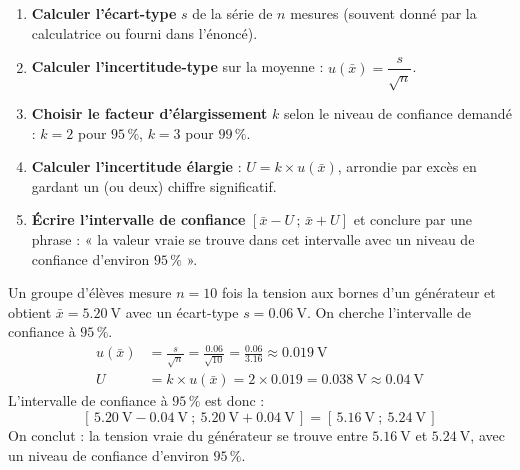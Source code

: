 \documentclass[11pt]{article}
\begin{document}
\begin{methode}
\begin{enumerate}
\item \textbf{Calculer l'écart-type} $s$ de la série de $n$ mesures (souvent donné par la calculatrice ou fourni dans l'énoncé).
\item \textbf{Calculer l'incertitude-type} sur la moyenne : $u(\bar{x}) = \dfrac{s}{\sqrt{n}}$.
\item \textbf{Choisir le facteur d'élargissement} $k$ selon le niveau de confiance demandé : $k = 2$ pour $95\,\%$, $k = 3$ pour $99\,\%$.
\item \textbf{Calculer l'incertitude élargie} : $U = k \times u(\bar{x})$, arrondie par excès en gardant un (ou deux) chiffre significatif.
\item \textbf{Écrire l'intervalle de confiance} $[\bar{x} - U \,;\, \bar{x} + U]$ et conclure par une phrase : « la valeur vraie se trouve dans cet intervalle avec un niveau de confiance d'environ $95\,\%$ ».
\end{enumerate}
\end{methode}

\begin{exemplebox}
Un groupe d'élèves mesure $n = 10$ fois la tension aux bornes d'un générateur et obtient $\bar{x} = \SI{5,20}{\volt}$ avec un écart-type $s = \SI{0,06}{\volt}$. On cherche l'intervalle de confiance à $95\,\%$.
\begin{align*}
u(\bar{x}) &= \frac{s}{\sqrt{n}} = \frac{\num{0,06}}{\sqrt{10}} = \frac{\num{0,06}}{\num{3,16}} \approx \num{0,019}~\text{V} \\
U &= k \times u(\bar{x}) = 2 \times \num{0,019} = \num{0,038}~\text{V} \approx \num{0,04}~\text{V}
\end{align*}
L'intervalle de confiance à $95\,\%$ est donc :
\[ [\, \SI{5,20}{\volt} - \SI{0,04}{\volt} \ ;\ \SI{5,20}{\volt} + \SI{0,04}{\volt} \,] = [\, \SI{5,16}{\volt} \ ;\ \SI{5,24}{\volt} \,] \]
On conclut : la tension vraie du générateur se trouve entre $\SI{5,16}{\volt}$ et $\SI{5,24}{\volt}$, avec un niveau de confiance d'environ $95\,\%$.
\end{exemplebox}
\end{document}
